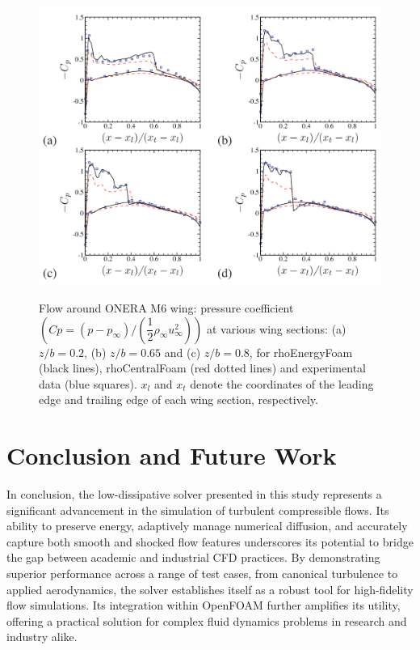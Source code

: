\documentclass[a5paper]{sapthesis}
\begin{document}
	\begin{figure}[htp]
		\begin{center}
			{\includegraphics[width=0.95\linewidth]{Figures/Cp_oneram6}}  
			\caption[Pressure coefficient of the flow around ONERA M6 wing.]{Flow around ONERA M6 wing: pressure coefficient $(Cp = (p-p_\infty)/(\dfrac{1}{2}\rho_\infty u^2_\infty))$ at various wing sections: (a) $z/b = 0.2$, (b) $z/b = 0.65$ and (c) $z/b = 0.8$, for rhoEnergyFoam (black lines), rhoCentralFoam (red dotted lines) and experimental data (blue squares). $x_l$ and $x_t$ denote the coordinates of the leading edge and trailing edge of each wing section, respectively.}
			\label{Cp_oneraM6}
		\end{center}
	\end{figure}

	\chapter{Conclusion and Future Work}
	\label{chap:conclusion}
	
	In conclusion, the low-dissipative solver presented in this study represents a significant advancement in the simulation of turbulent compressible flows. Its ability to preserve energy, adaptively manage numerical diffusion, and accurately capture both smooth and shocked flow features underscores its potential to bridge the gap between academic and industrial CFD practices. By demonstrating superior performance across a range of test cases, from canonical turbulence to applied aerodynamics, the solver establishes itself as a robust tool for high-fidelity flow simulations. Its integration within OpenFOAM further amplifies its utility, offering a practical solution for complex fluid dynamics problems in research and industry alike.
	

	\cleardoublepage
	
\end{document}
